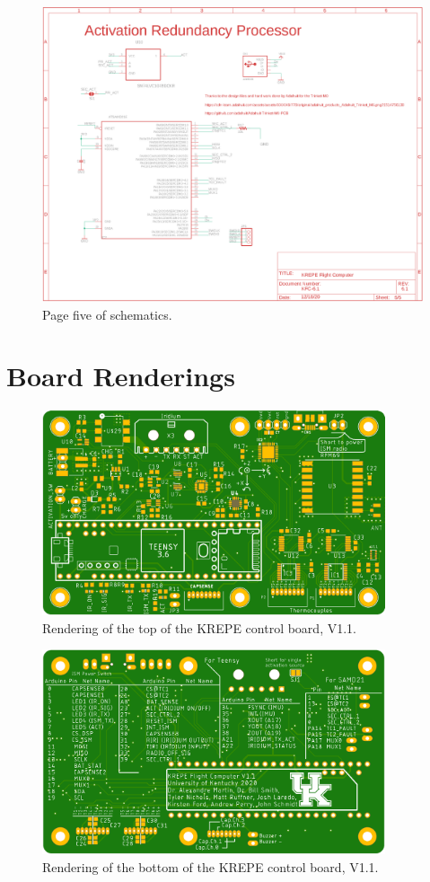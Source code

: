 \documentclass{article}
\begin{document}
\begin{figure}[H]
    \centering
    \includegraphics[width=\textwidth]{images/page5.png}
    \caption{Page five of schematics.}
    \label{fig:page1-5}
\end{figure}

\section{Board Renderings}
\begin{figure}[H]
	\centering
	\includegraphics[width=0.9\textwidth]{images/krepe-top.png}
	\caption{Rendering of the top of the KREPE control board, V1.1.}
	\label{fig:board-top}
\end{figure}
\begin{figure}[H]
	\centering
	\includegraphics[width=0.9\textwidth]{images/krepe-bottom.png}
	\caption{Rendering of the bottom of the KREPE control board, V1.1.}
	\label{fig:board-bottom}
\end{figure}
%
\end{document}
